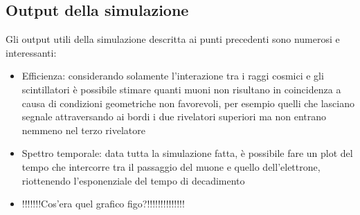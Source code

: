 \subsection{Output della simulazione}
Gli output utili della simulazione descritta ai punti precedenti sono numerosi e interessanti:
\begin{itemize}
\item Efficienza: considerando solamente l'interazione tra i raggi cosmici e gli scintillatori è possibile stimare quanti muoni non risultano in coincidenza a causa
di condizioni geometriche non favorevoli, per esempio quelli che lasciano segnale attraversando ai bordi i due rivelatori superiori ma non entrano nemmeno nel terzo
rivelatore
\item Spettro temporale: data tutta la simulazione fatta, è possibile fare un plot del tempo che intercorre tra il passaggio del muone e quello dell'elettrone, riottenendo
l'esponenziale del tempo di decadimento
\item !!!!!!!Cos'era quel grafico figo?!!!!!!!!!!!!!!
\end{itemize}
